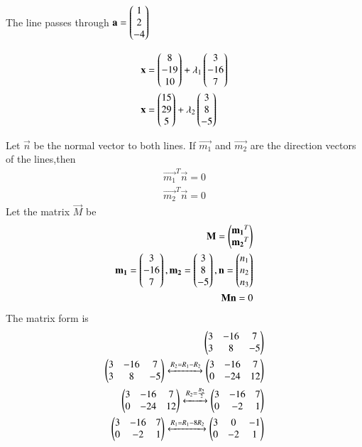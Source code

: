 The line passes through
$\mathbf{a} = \begin{pmatrix}1 \\2 \\-4\end{pmatrix}$

\begin{align}   
\mathbf{x} &=\begin{pmatrix} 8\\ -19\\ 10\end{pmatrix} + \lambda_1\begin{pmatrix} 3 \\-16\\ 7\end{pmatrix} \\
\mathbf{x} &=\begin{pmatrix}15\\ 29\\ 5\end{pmatrix} + \lambda_2\begin{pmatrix} 3 \\8\\ -5\end{pmatrix} 
\end{align}


Let $\vec{n}$ be the normal vector to both lines. If $\vec{m_1}$ and $\vec{m_2}$ are the direction vectors of the lines,then
\begin{align}
\vec{m_1}^T  \vec{n} = 0 \\  
\vec{m_2}^T\vec{n} = 0    
\end{align}
Let the matrix $\vec{M}$ be
\begin{align}
\mathbf{M}=\begin{pmatrix}\mathbf{m_1}^T\\\mathbf{m_2}^T\end{pmatrix}\\
\mathbf{m_1}=\begin{pmatrix}3\\-16\\7\end{pmatrix} ,  \mathbf{m_2}=\begin{pmatrix}3\\8\\-5\end{pmatrix},\mathbf{n}=\begin{pmatrix}n_1\\n_2\\n_3\end{pmatrix} \\
\mathbf{M}\mathbf{n}=0
\end{align}
The matrix form is
\begin{align}
	\begin{pmatrix}3 & -16 & 7 \\ 3 & 8 & -5\end{pmatrix}\\
	\begin{pmatrix}3 & -16 & 7 \\ 3 & 8 & -5 \end{pmatrix} \xleftrightarrow{R_2=R_1-R_2}\begin{pmatrix}3 & -16 & 7 \\ 0 & -24 & 12 \end{pmatrix}\\
	\begin{pmatrix}3 & -16 & 7 \\ 0 & -24 & 12\end{pmatrix}\xleftrightarrow{R_2=\frac{R_2}{2}}\begin{pmatrix}3 & -16 & 7 \\ 0 & -2 & 1 \end{pmatrix}\\
	\begin{pmatrix}3 & -16 & 7 \\ 0 & -2 & 1 \end{pmatrix}\xleftrightarrow{R_1=R_1 -8R_2}\begin{pmatrix}3 & 0 & -1 \\ 0 & -2 & 1\end{pmatrix}
\end{align}
